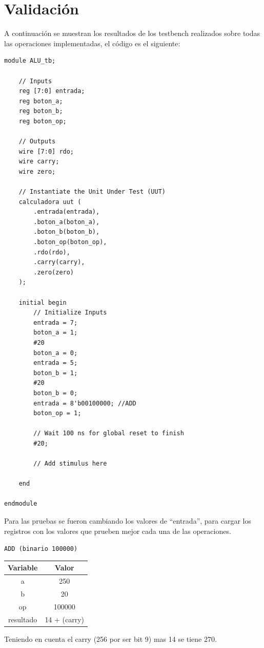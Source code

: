 \documentclass[letterpaper]{sae}
\begin{document}
\section{Validación}
A continuación se muestran los resultados de los testbench
realizados sobre todas las operaciones implementadas, el código es el siguiente:
\begin{lstlisting}
module ALU_tb;

	// Inputs
	reg [7:0] entrada;
	reg boton_a;
	reg boton_b;
	reg boton_op;

	// Outputs
	wire [7:0] rdo;
	wire carry;
	wire zero;

	// Instantiate the Unit Under Test (UUT)
	calculadora uut (
		.entrada(entrada), 
		.boton_a(boton_a), 
		.boton_b(boton_b), 
		.boton_op(boton_op), 
		.rdo(rdo), 
		.carry(carry), 
		.zero(zero)
	);

	initial begin
		// Initialize Inputs
		entrada = 7;
		boton_a = 1;
		#20
		boton_a = 0;
		entrada = 5;
		boton_b = 1;
		#20
		boton_b = 0;
		entrada = 8'b00100000; //ADD
		boton_op = 1;

		// Wait 100 ns for global reset to finish
		#20;
        
		// Add stimulus here

	end
      
endmodule
\end{lstlisting}

Para las pruebas se fueron cambiando los valores de “entrada”, 
para cargar los registros con los valores que prueben mejor cada una de las operaciones.

\verb+ADD (binario 100000)+\\

\begin{center}
	\begin{tabular}{|c|c|}
		\hline 
		Variable & Valor\tabularnewline
		\hline 
		\hline 
		a & 250\tabularnewline
		\hline 
		b & 20\tabularnewline
		\hline 
		op & 100000\tabularnewline
		\hline 
		resultado & 14 + (carry)\tabularnewline
		\hline 
	\end{tabular}
\end{center}

Teniendo en cuenta el carry (256 por ser bit 9) mas 14 se tiene 270.
\end{document}
